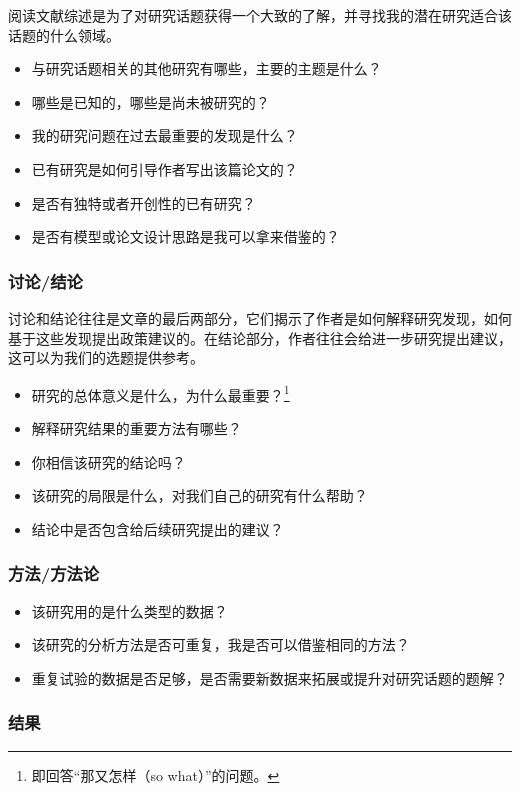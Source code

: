 \documentclass[cn,hazy,blue,14pt,screen]{elegantnote} %
\begin{document}
阅读文献综述是为了对研究话题获得一个大致的了解，并寻找我的潜在研究适合该话题的什么领域。

\begin{itemize}
  \item 与研究话题相关的其他研究有哪些，主要的主题是什么？
  \item 哪些是已知的，哪些是尚未被研究的？
  \item 我的研究问题在过去最重要的发现是什么？
  \item 已有研究是如何引导作者写出该篇论文的？
  \item 是否有独特或者开创性的已有研究？
  \item 是否有模型或论文设计思路是我可以拿来借鉴的？
\end{itemize}

\subsubsection{讨论/结论}

讨论和结论往往是文章的最后两部分，它们揭示了作者是如何解释研究发现，如何基于这些发现提出政策建议的。在结论部分，作者往往会给进一步研究提出建议，这可以为我们的选题提供参考。

\begin{itemize}
  \item 研究的总体意义是什么，为什么最重要？\footnote{即回答“那又怎样（so what）”的问题。}
  \item 解释研究结果的重要方法有哪些？
  \item 你相信该研究的结论吗？
  \item 该研究的局限是什么，对我们自己的研究有什么帮助？
  \item 结论中是否包含给后续研究提出的建议？
\end{itemize}

\subsubsection{方法/方法论}

\begin{itemize}
  \item 该研究用的是什么类型的数据？
  \item 该研究的分析方法是否可重复，我是否可以借鉴相同的方法？
  \item 重复试验的数据是否足够，是否需要新数据来拓展或提升对研究话题的题解？
\end{itemize}

\subsubsection{结果}
\end{document}
